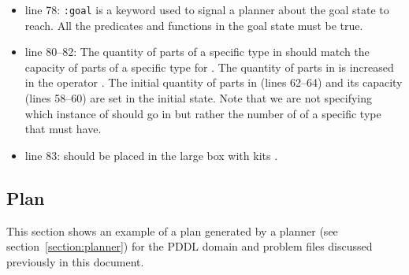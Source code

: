 \begin{itemize}
\item line 78: \texttt{:goal} is a keyword used to signal a planner about the goal state to reach. All the predicates and functions in the goal state must be true.
\item line 80--82: The quantity of parts of a specific type in  should match the capacity of parts of a specific type for . The quantity of parts in  is increased in the operator . The initial quantity of parts in  (lines 62--64) and its capacity (lines 58--60) are set in the initial state. Note that we are not specifying which instance of  should go in  but rather the number of  of a specific type that  must have.
\item line 83:  should be placed in the large box with kits .
\end{itemize}

\subsection{Plan}
This section shows an example of a plan generated by a planner (see section~\ref{section:planner}) for the PDDL domain and problem files discussed previously in this document.

